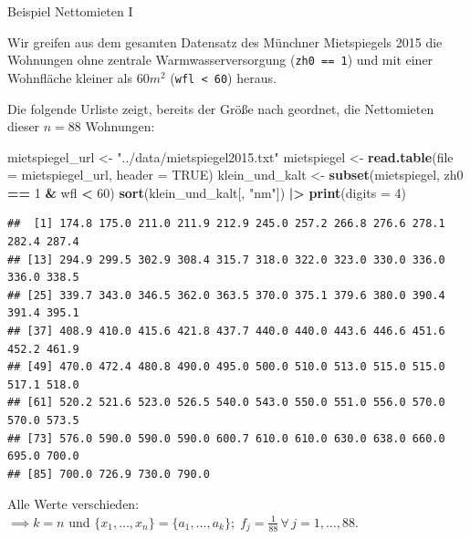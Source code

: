 \documentclass[
  10pt,
  ignorenonframetext,
]{beamer}
\newenvironment{Shaded}{\begin{snugshade}}{\end{snugshade}}
\newcommand{\AttributeTok}[1]{\textcolor[rgb]{0.13,0.29,0.53}{#1}}
\newcommand{\ConstantTok}[1]{\textcolor[rgb]{0.56,0.35,0.01}{#1}}
\newcommand{\DecValTok}[1]{\textcolor[rgb]{0.00,0.00,0.81}{#1}}
\newcommand{\FunctionTok}[1]{\textcolor[rgb]{0.13,0.29,0.53}{\textbf{#1}}}
\newcommand{\NormalTok}[1]{#1}
\newcommand{\OtherTok}[1]{\textcolor[rgb]{0.56,0.35,0.01}{#1}}
\newcommand{\SpecialCharTok}[1]{\textcolor[rgb]{0.81,0.36,0.00}{\textbf{#1}}}
\newcommand{\StringTok}[1]{\textcolor[rgb]{0.31,0.60,0.02}{#1}}
\begin{document}
\begin{frame}[fragile]{Beispiel Nettomieten I}
\protect\hypertarget{beispiel-nettomieten-i}{}
\scriptsize\normalsize

Wir greifen aus dem gesamten Datensatz des Münchner Mietspiegels 2015
die Wohnungen ohne zentrale Warmwasserversorgung (\texttt{zh0\ ==\ 1})
und mit einer Wohnfläche kleiner als \(60m^2\)
(\texttt{wfl\ \textless{}\ 60}) heraus.

Die folgende Urliste zeigt, bereits der Größe nach geordnet, die
Nettomieten dieser \(n=88\) Wohnungen:

\scriptsize

\begin{Shaded}
\begin{Highlighting}[]
\NormalTok{mietspiegel\_url }\OtherTok{\textless{}{-}} \StringTok{"../data/mietspiegel2015.txt"}
\NormalTok{mietspiegel }\OtherTok{\textless{}{-}} \FunctionTok{read.table}\NormalTok{(}\AttributeTok{file =}\NormalTok{ mietspiegel\_url, }\AttributeTok{header =} \ConstantTok{TRUE}\NormalTok{)}
\NormalTok{klein\_und\_kalt }\OtherTok{\textless{}{-}} \FunctionTok{subset}\NormalTok{(mietspiegel, zh0 }\SpecialCharTok{==} \DecValTok{1} \SpecialCharTok{\&}\NormalTok{ wfl }\SpecialCharTok{\textless{}} \DecValTok{60}\NormalTok{)}
\FunctionTok{sort}\NormalTok{(klein\_und\_kalt[, }\StringTok{"nm"}\NormalTok{]) }\SpecialCharTok{|\textgreater{}}
    \FunctionTok{print}\NormalTok{(}\AttributeTok{digits =} \DecValTok{4}\NormalTok{)}
\end{Highlighting}
\end{Shaded}

\begin{verbatim}
##  [1] 174.8 175.0 211.0 211.9 212.9 245.0 257.2 266.8 276.6 278.1 282.4 287.4
## [13] 294.9 299.5 302.9 308.4 315.7 318.0 322.0 323.0 330.0 336.0 336.0 338.5
## [25] 339.7 343.0 346.5 362.0 363.5 370.0 375.1 379.6 380.0 390.4 391.4 395.1
## [37] 408.9 410.0 415.6 421.8 437.7 440.0 440.0 443.6 446.6 451.6 452.2 461.9
## [49] 470.0 472.4 480.8 490.0 495.0 500.0 510.0 513.0 515.0 515.0 517.1 518.0
## [61] 520.2 521.6 523.0 526.5 540.0 543.0 550.0 551.0 556.0 570.0 570.0 573.5
## [73] 576.0 590.0 590.0 590.0 600.7 610.0 610.0 630.0 638.0 660.0 695.0 700.0
## [85] 700.0 726.9 730.0 790.0
\end{verbatim}

\normalsize

Alle Werte verschieden:\\
\(\implies k=n\) und
\(\{x_1 , \ldots , x_n\} = \{a_1 , \ldots , a_k\};\; f_j = \frac{1}{88} \,\forall\, j = 1, \ldots, 88\).
\end{frame}
\end{document}
